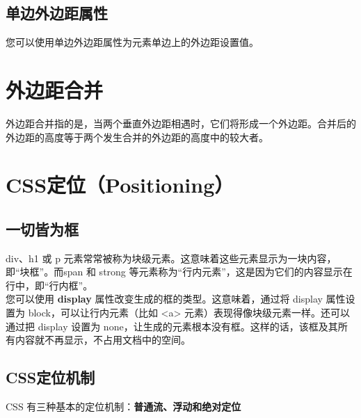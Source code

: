 \documentclass[10pt,UTF8]{ctexart}
\begin{document}
\subsection{单边外边距属性}
您可以使用单边外边距属性为元素单边上的外边距设置值。

\section{外边距合并}
外边距合并指的是，当两个垂直外边距相遇时，它们将形成一个外边距。合并后的外边距的高度等于两个发生合并的外边距的高度中的较大者。
\section{CSS定位（Positioning）}
\subsection{一切皆为框}
div、h1 或 p 元素常常被称为块级元素。这意味着这些元素显示为一块内容，即“块框”。而span 和 strong 等元素称为“行内元素”，这是因为它们的内容显示在行中，即“行内框”。\\
您可以使用 \textbf{display} 属性改变生成的框的类型。这意味着，通过将 display 属性设置为 block，可以让行内元素（比如 <a> 元素）表现得像块级元素一样。还可以通过把 display 设置为 none，让生成的元素根本没有框。这样的话，该框及其所有内容就不再显示，不占用文档中的空间。\\
\subsection{CSS定位机制}
CSS 有三种基本的定位机制：\textbf{普通流、浮动和绝对定位}
\end{document}
